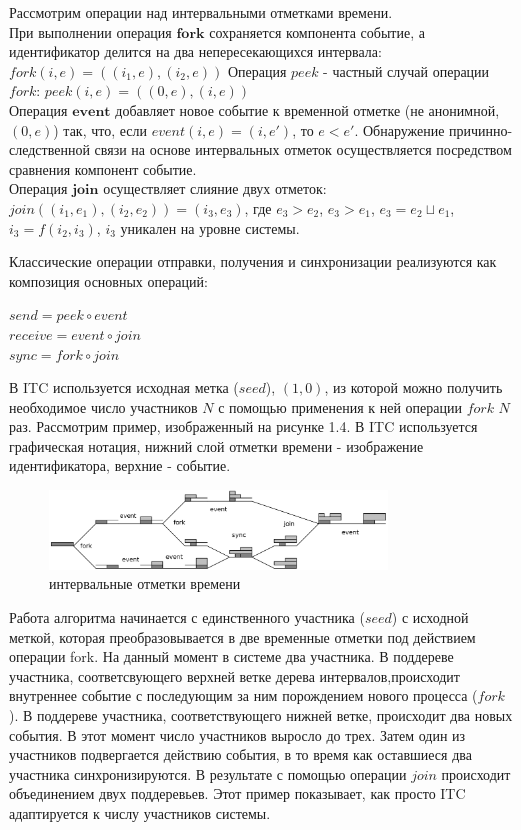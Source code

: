 Рассмотрим операции над интервальными отметками времени.\\
При выполнении операция $\textbf{fork}$ сохраняется компонента событие, а идентификатор делится на два непересекающихся интервала: $fork(i,e) = ((i_1,e),(i_2,e))$  
Операция $peek$ - частный случай операции $fork$: $peek(i,e)=((0,e),(i,e))$\\
Операция $\textbf{event}$ добавляет новое событие к временной отметке (не анонимной, $(0,e)$) так, что, если $event(i,e) = (i,e')$, то $e < e'$. 
Обнаружение причинно-следственной связи на основе интервальных отметок осуществляется посредством сравнения компонент событие.\\
Операция $\textbf{join}$ осуществляет слияние двух отметок: $join((i_1,e_1),(i_2,e_2)) = (i_3,e_3)$, где
$e_3 > e_2$, $e_3 > e_1$, $e_3 = e_2 \sqcup e_1$, $i_3 = f(i_2,i_3)$, $i_3$ уникален на уровне системы.
\par
Классические операции отправки, получения и синхронизации реализуются как композиция основных операций:
\begin{center}
$send = peek \circ event$\\
$receive = event \circ join$\\
$sync = fork \circ join$
\end{center}
В ITC используется исходная метка ($seed$), $(1,0)$, из которой можно получить необходимое число участников $N$ с помощью применения к ней операции $fork$ $N$ раз.
Рассмотрим пример, изображенный на рисунке 1.4. В ITC используется графическая нотация, нижний слой отметки времени - изображение идентификатора, верхние - событие. 
\begin{figure}
\centering
\includegraphics[width=0.8\textwidth]{img/tree.png}
\caption{интервальные отметки времени}
\end{figure}
Работа алгоритма начинается с единственного участника ($seed$) с исходной меткой, которая преобразовывается в две временные отметки под действием операции fork. На данный момент в системе два участника. В поддереве участника, соответсвующего верхней ветке дерева интервалов,происходит внутреннее событие с последующим за ним порождением нового процесса ($fork$). В поддереве участника, соответствующего нижней ветке, происходит два новых события. В этот момент число участников выросло до трех. Затем один из участников подвергается действию события, в то время как оставшиеся два участника синхронизируются. В результате с помощью операции $join$ происходит объединением двух поддеревьев. Этот пример показывает, как просто ITC адаптируется к числу участников системы.

